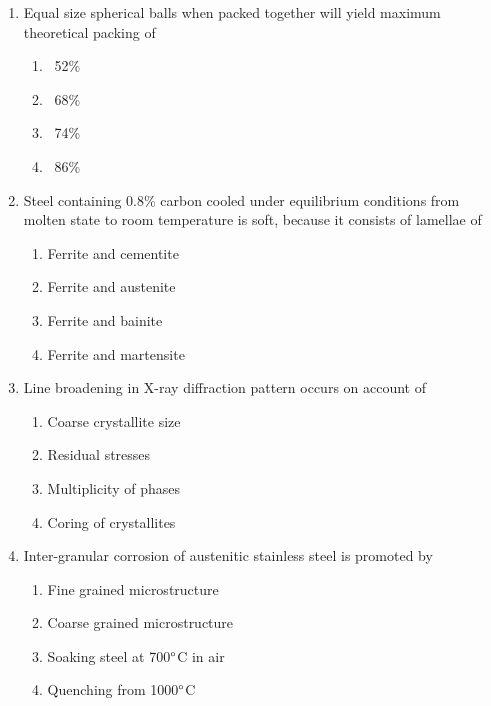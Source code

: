 \documentclass[journal,9pt,onecolumn]{IEEEtran}
\begin{document}
\begin{enumerate}


\item Equal size spherical balls when packed together will yield maximum theoretical packing of
\begin{multicols}{4}    
\begin{enumerate}
     \item ~52\%
     \item ~68\%
     \item ~74\%
     \item ~86\%
\end{enumerate}
\end{multicols}

\item Steel containing 0.8\% carbon cooled under equilibrium conditions from molten state to room
temperature is soft, because it consists of lamellae of
\begin{multicols}{2}
\begin{enumerate}
    \item Ferrite and cementite
    \item Ferrite and austenite
    \item Ferrite and bainite
    \item Ferrite and martensite
\end{enumerate}
\end{multicols}


\item  Line broadening in X-ray diffraction pattern occurs on account of
\begin{multicols}{2}
\begin{enumerate}
    \item Coarse crystallite size
    \item Residual stresses
    \item Multiplicity of phases
    \item Coring of crystallites
    \end{enumerate}
\end{multicols}


\item  Inter-granular corrosion of austenitic stainless steel is promoted by
\begin{multicols}{2}    
\begin{enumerate}
    \item Fine grained microstructure 
    \item Coarse grained microstructure
    \item Soaking steel at 700$\degree$C in air
    \item Quenching from 1000$\degree$C
\end{enumerate}
\end{multicols}



\end{enumerate}
\end{document}
